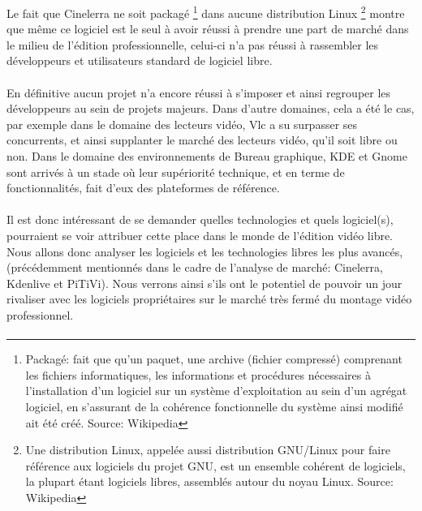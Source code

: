 
Le fait que Cinelerra ne soit packagé \footnote{Packagé: fait
que qu'un paquet, une archive (fichier compressé) comprenant les
fichiers informatiques, les informations et procédures nécessaires
à l'installation d'un logiciel sur un système d'exploitation au sein
d'un agrégat logiciel, en s'assurant de la cohérence fonctionnelle
du système ainsi modifié ait été créé. Source: Wikipedia} dans
aucune distribution Linux \footnote {Une distribution Linux, appelée
aussi distribution GNU/Linux pour faire référence aux logiciels du
projet GNU, est un ensemble cohérent de logiciels, la plupart étant
logiciels libres, assemblés autour du noyau Linux. Source: Wikipedia}
montre que même ce logiciel est le seul à avoir réussi à prendre une
part de marché dans le milieu de l'édition professionnelle, celui-ci
n'a pas réussi à rassembler les développeurs et utilisateurs standard
de logiciel libre.

\paragraph{}

En définitive aucun projet n'a encore réussi à s'imposer et ainsi
regrouper les développeurs au sein de projets majeurs. Dans d'autre
domaines, cela a été le cas, par exemple dans le domaine des lecteurs
vidéo, Vlc a su surpasser ses concurrents, et ainsi supplanter le
marché des lecteurs vidéo, qu'il soit libre ou non. Dans le domaine
des environnements de Bureau graphique, KDE et Gnome sont arrivés à un
stade où leur supériorité technique, et en terme de fonctionnalités,
fait d'eux des plateformes de référence.

\paragraph{}

Il est donc intéressant de se demander quelles technologies et quels
logiciel(s), pourraient se voir attribuer cette place dans le monde
de l'édition vidéo libre. Nous allons donc analyser les logiciels et
les technologies libres les plus avancés, (précédemment mentionnés
dans le cadre de l'analyse de marché: Cinelerra, Kdenlive et PiTiVi).
Nous verrons ainsi s'ils ont le potentiel de pouvoir un jour rivaliser
avec les logiciels propriétaires sur le marché très fermé du montage
vidéo professionnel.

\paragraph{}

